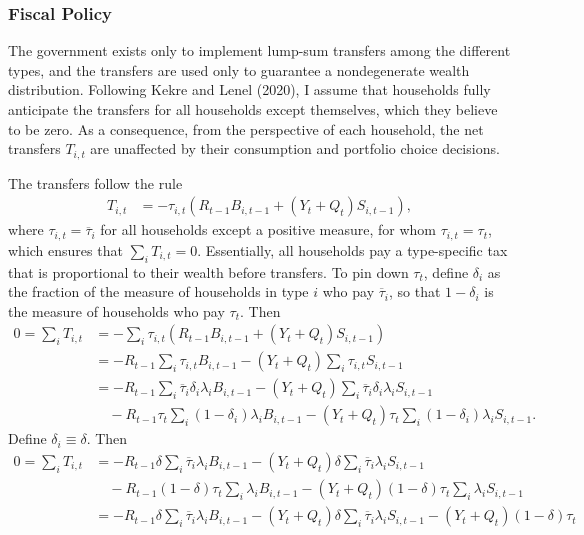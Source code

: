 \documentclass[12 pt, oneside]{article}
\theoremstyle{definition}
\theoremstyle{definition}
\theoremstyle{definition}
\begin{document}
\subsubsection{Fiscal Policy}
The government exists only to implement lump-sum transfers among the different types, and the transfers are used only to guarantee a nondegenerate wealth distribution. Following Kekre and Lenel (2020), I assume that households fully anticipate the transfers for all households except themselves,
which they believe to be zero. As a consequence, from the perspective of each household, the net transfers $T_{i, t}$ are unaffected by their consumption and portfolio choice decisions.

The transfers follow the rule
\begin{align}\label{eq:net transfer rule}
  T_{i, t} & = -\tau_{i, t}(R_{t - 1} B_{i, t - 1} + (Y_t + Q_t)S_{i, t - 1}),
\end{align}
where $\tau_{i, t} = \overline{\tau}_i$ for all households except a positive measure, for whom $\tau_{i, t} = \tau_t$, which ensures that $\sum_i T_{i, t} = 0$.
Essentially, all households pay a type-specific tax that is proportional to their wealth before transfers. To pin down $\tau_t$,
define $\delta_i$ as the fraction of the measure of households in type $i$ who pay $\overline{\tau}_i$, so that $1 - \delta_i$ is the measure of households who pay $\tau_t$. Then
\begin{align*}
 0 = \sum_i T_{i, t} & = -\sum_i \tau_{i, t}(R_{t - 1} B_{i, t - 1} + (Y_t + Q_t)S_{i, t - 1})\\
                  & = -R_{t - 1}\sum_i \tau_{i, t}B_{i, t - 1} - (Y_t + Q_t)\sum_i \tau_{i, t}S_{i, t - 1}\\
                  & = -R_{t - 1}\sum_i \overline{\tau}_i\delta_i \lambda_i B_{i, t - 1} - (Y_t + Q_t)\sum_i \overline{\tau}_i\delta_i\lambda_iS_{i, t - 1}\\
                  & \quad -R_{t - 1}\tau_t\sum_i (1 - \delta_i)\lambda_i B_{i, t - 1} - (Y_t + Q_t)\tau_t\sum_i (1 - \delta_i)\lambda_i S_{i, t - 1}.
\end{align*}
Define $\delta_i \equiv \delta$. Then
\begin{align*}
 0 = \sum_i T_{i, t} & = -R_{t - 1}\delta\sum_i \overline{\tau}_i \lambda_i B_{i, t - 1} - (Y_t + Q_t)\delta\sum_i \overline{\tau}_i\lambda_iS_{i, t - 1}\\
& \quad -R_{t - 1}(1 - \delta)\tau_t\sum_i \lambda_i B_{i, t - 1} - (Y_t + Q_t)(1 - \delta)\tau_t\sum_i \lambda_i S_{i, t - 1}\\
                  & = -R_{t - 1}\delta\sum_i \overline{\tau}_i \lambda_i B_{i, t - 1} - (Y_t + Q_t)\delta\sum_i \overline{\tau}_i\lambda_iS_{i, t - 1}- (Y_t + Q_t)(1 - \delta)\tau_t
\end{align*}
\end{document}
